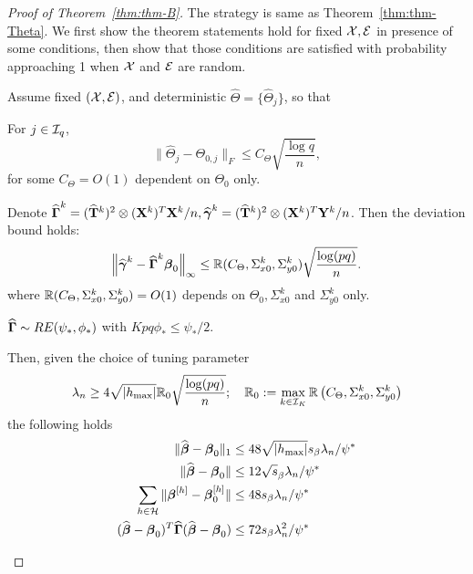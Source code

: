 \begin{proof}[Proof of Theorem~\ref{thm:thm-B}]
The strategy is same as Theorem~\ref{thm:thm-Theta}. We first show the theorem statements hold for fixed ${\cal{X}}, {\cal{E}}$ in presence of some conditions, then show that those conditions are satisfied with probability approaching 1 when ${\cal{X}}$ and ${\cal{E}}$ are random.


\begin{Lemma}\label{thm:BetaThm}
Assume fixed $({\cal{X}}, {\cal{E}})$, and deterministic $\widehat \Theta = \{ \widehat \Theta_j \}$, so that

 For $j \in {\cal{I}}_q$,
%
$$
\| \widehat \Theta_j - \Theta_{0,j} \|_F \leq C_\Theta \sqrt{\frac{\log q}{n}},
$$
%
for some $C_\Theta = O(1)$ dependent on $\Theta_0$ only.

 Denote $\widehat {{\boldsymbol{\Gamma}}}^k = (\widehat {{\mathbf{T}}}^k)^2 \otimes ({\mathbf{X}}^k)^T {\mathbf{X}}^k/n, \widehat {{\boldsymbol{\gamma}}}^k = (\widehat {{\mathbf{T}}}^k)^2 \otimes ({\mathbf{X}}^k)^T {\mathbf{Y}}^k/n$. Then the deviation bound holds:
%
$$
\left\| \widehat {{\boldsymbol{\gamma}}}^k - \widehat {{\boldsymbol{\Gamma}}}^k {\boldsymbol{\beta}}_0 \right\|_\infty \leq {\mathbb{R}}( C_\Theta, \Sigma_{x0}^k, \Sigma_{y0}^k) \sqrt{ \frac{ \log(pq)}{n}}.
$$
%
where ${\mathbb{R}} (C_\Theta, \Sigma_{x0}^k, \Sigma_{y0}^k ) = O(1)$ depends on $\Theta_0, \Sigma_{x0}^k$ and $\Sigma_{y0}^k$ only.

 $\widehat {{\boldsymbol{\Gamma}}} \sim RE(\psi_*, \phi_*)$ with $Kpq \phi_* \leq \psi_*/2$.

Then, given the choice of tuning parameter
%
$$
\lambda_n \geq 4 \sqrt{| h_{\max} |} {\mathbb{R}}_0 \sqrt{ \frac{ \log(pq)}{n}}; \quad 
{\mathbb{R}}_0 := \max_{k \in {\cal{I}}_K} {\mathbb{R}} \left(C_\Theta, \Sigma_{x0}^k, \Sigma_{y0}^k \right)
$$
%
the following holds
%
\begin{align}
\| \widehat {{\boldsymbol{\beta}}} - {\boldsymbol{\beta}}_0 \|_1 & \leq 48 \sqrt{ | h_{\max} |} s_\beta \lambda_n / \psi^* \label{eqn:BetaThmEqn1}\\
\| \widehat {{\boldsymbol{\beta}}} - {\boldsymbol{\beta}}_0 \| & \leq 12 \sqrt s_\beta \lambda_n / \psi^* \label{eqn:BetaThmEqn2}\\
\sum_{h \in {\cal{H}}} \| {\boldsymbol{\beta}}^{[h]} - {\boldsymbol{\beta}}_0^{[h]} \| & \leq 48 s_\beta \lambda_n / \psi^* \label{eqn:BetaThmEqn3}\\
(\widehat {{\boldsymbol{\beta}}} - {\boldsymbol{\beta}}_0 )^T \widehat {{\boldsymbol{\Gamma}}} (\widehat {{\boldsymbol{\beta}}} - {\boldsymbol{\beta}}_0 ) & \leq
72 s_\beta \lambda_n^2 / \psi^* \label{eqn:BetaThmEqn4}
\end{align}
\end{Lemma}


\end{proof}
